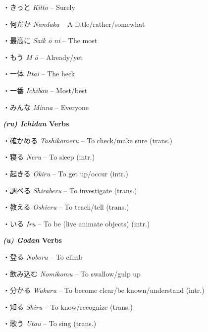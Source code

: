 \par{・きっと \emph{Kitto }– Surely }

\par{・何だか \emph{Nandaka }– A little\slash rather\slash somewhat }

\par{・最高に \emph{Saik }\emph{ō ni }– The most }

\par{・もう \emph{M }\emph{ō }– Already\slash yet }

\par{・一体 \emph{Ittai }– The heck }

\par{・一番 \emph{Ichiban }– Most\slash best }

\par{・みんな \emph{Min\textquotesingle na }– Everyone }

\par{\textbf{\emph{(ru) Ichidan }Verbs }}

\par{・確かめる \emph{Tashikameru }– To check\slash make sure (trans.) }

\par{・寝る \emph{Neru }– To sleep (intr.) }

\par{・起きる \emph{Okiru }– To get up\slash occur (intr.) }

\par{・調べる \emph{Shiraberu }– To investigate (trans.) }

\par{・教える \emph{Oshieru }– To teach\slash tell (trans.) }

\par{・いる \emph{Iru }– To be (live animate objects) (intr.) }

\par{\textbf{\emph{(u) Godan }Verbs }}

\par{・登る \emph{Noboru }– To climb }

\par{・飲み込む \emph{Nomikomu }– To swallow\slash gulp up }

\par{・分かる \emph{Wakaru }– To become clear\slash be known\slash understand (intr.) }

\par{・知る \emph{Shiru }– To know\slash recognize (trans.) }

\par{・歌う \emph{Utau }– To sing (trans.) }

